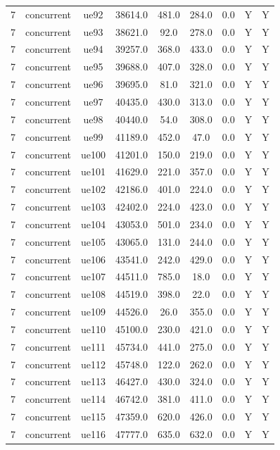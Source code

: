 \begin{table}[ht]
\begin{tabular}{|c|c|c|c|c|c|c|c|c|}
7 & concurrent & ue92 & 38614.0 & 481.0 & 284.0 & 0.0 & Y & Y \\
7 & concurrent & ue93 & 38621.0 & 92.0 & 278.0 & 0.0 & Y & Y \\
7 & concurrent & ue94 & 39257.0 & 368.0 & 433.0 & 0.0 & Y & Y \\
7 & concurrent & ue95 & 39688.0 & 407.0 & 328.0 & 0.0 & Y & Y \\
7 & concurrent & ue96 & 39695.0 & 81.0 & 321.0 & 0.0 & Y & Y \\
7 & concurrent & ue97 & 40435.0 & 430.0 & 313.0 & 0.0 & Y & Y \\
7 & concurrent & ue98 & 40440.0 & 54.0 & 308.0 & 0.0 & Y & Y \\
7 & concurrent & ue99 & 41189.0 & 452.0 & 47.0 & 0.0 & Y & Y \\
7 & concurrent & ue100 & 41201.0 & 150.0 & 219.0 & 0.0 & Y & Y \\
7 & concurrent & ue101 & 41629.0 & 221.0 & 357.0 & 0.0 & Y & Y \\
7 & concurrent & ue102 & 42186.0 & 401.0 & 224.0 & 0.0 & Y & Y \\
7 & concurrent & ue103 & 42402.0 & 224.0 & 423.0 & 0.0 & Y & Y \\
7 & concurrent & ue104 & 43053.0 & 501.0 & 234.0 & 0.0 & Y & Y \\
7 & concurrent & ue105 & 43065.0 & 131.0 & 244.0 & 0.0 & Y & Y \\
7 & concurrent & ue106 & 43541.0 & 242.0 & 429.0 & 0.0 & Y & Y \\
7 & concurrent & ue107 & 44511.0 & 785.0 & 18.0 & 0.0 & Y & Y \\
7 & concurrent & ue108 & 44519.0 & 398.0 & 22.0 & 0.0 & Y & Y \\
7 & concurrent & ue109 & 44526.0 & 26.0 & 355.0 & 0.0 & Y & Y \\
7 & concurrent & ue110 & 45100.0 & 230.0 & 421.0 & 0.0 & Y & Y \\
7 & concurrent & ue111 & 45734.0 & 441.0 & 275.0 & 0.0 & Y & Y \\
7 & concurrent & ue112 & 45748.0 & 122.0 & 262.0 & 0.0 & Y & Y \\
7 & concurrent & ue113 & 46427.0 & 430.0 & 324.0 & 0.0 & Y & Y \\
7 & concurrent & ue114 & 46742.0 & 381.0 & 411.0 & 0.0 & Y & Y \\
7 & concurrent & ue115 & 47359.0 & 620.0 & 426.0 & 0.0 & Y & Y \\
7 & concurrent & ue116 & 47777.0 & 635.0 & 632.0 & 0.0 & Y & Y \\

\end{tabular}
\end{table}

